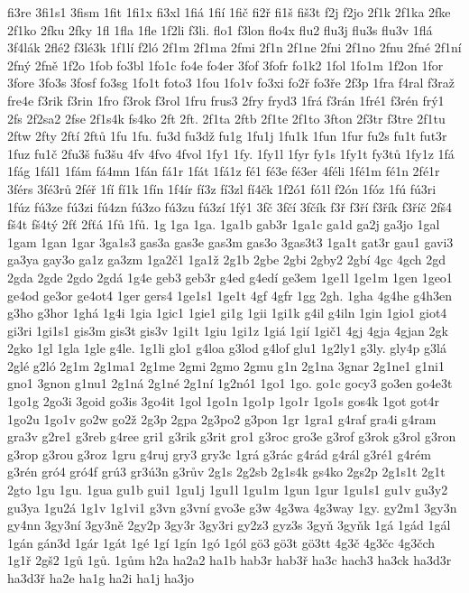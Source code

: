 fi3re
3fi1s1
3fism
1fit
1fi1x
fi3xl
1fiá
1fií
1fič
fi2ř
fi1š
fiš3t
f2j
f2jo
2f1k
2f1ka
2fke
2f1ko
2fku
2fky
1fl
1fla
1fle
1f2li
f3li.
flo1
f3lon
flo4x
flu2
flu3j
flu3s
flu3v
1flá
3f4lák
2flé2
f3lé3k
1f1lí
f2ló
2f1m
2f1ma
2fmi
2f1n
2f1ne
2fni
2f1no
2fnu
2fné
2f1ní
2fný
2fně
1f2o
1fob
fo3bl
1fo1c
fo4e
fo4er
3fof
3fofr
fo1k2
1fol
1fo1m
1f2on
1for
3fore
3fo3s
3fosf
fo3sg
1fo1t
foto3
1fou
1fo1v
fo3xi
fo2ř
fo3ře
2f3p
1fra
f4ral
f3raž
fre4e
f3rik
f3rin
1fro
f3rok
f3rol
1fru
frus3
2fry
fryd3
1frá
f3rán
1fré1
f3rén
frý1
2fs
2f2sa2
2fse
2f1s4k
fs4ko
2ft
2ft.
2f1ta
2ftb
2f1te
2f1to
3fton
2f3tr
f3tre
2f1tu
2ftw
2fty
2ftí
2ftů
1fu
1fu.
fu3d
fu3dž
fu1g
1fu1j
1fu1k
1fun
1fur
fu2s
fu1t
fut3r
1fuz
fu1č
2fu3š
fu3šu
4fv
4fvo
4fvol
1fy1
1fy.
1fy1l
1fyr
fy1s
1fy1t
fy3tů
1fy1z
1fá
1fág
1fál1
1fám
fá4mn
1fán
fá1r
1fát
1fá1z
fé1
fé3e
fé3er
4féli
1fé1m
fé1n
2fé1r
3férs
3fé3rů
2féř
1fí
fí1k
1fín
1f4ír
fí3z
fí3zl
fí4čk
1f2ó1
fó1l
f2ón
1fóz
1fú
fú3ri
1fúz
fú3ze
fú3zi
fú4zn
fú3zo
fú3zu
fú3zí
1fý1
3fč
3fčí
3fčík
f3ř
f3ří
f3řík
f3říč
2fš4
fš4t
fš4tý
2fť
2fťá
1fů
1fů.
1g
1ga
1ga.
1ga1b
gab3r
1ga1c
ga1d
ga2j
ga3jo
1gal
1gam
1gan
1gar
3ga1s3
gas3a
gas3e
gas3m
gas3o
3gas3t3
1ga1t
gat3r
gau1
gavi3
ga3ya
gay3o
ga1z
ga3zm
1ga2č1
1ga1ž
2g1b
2gbe
2gbi
2gby2
2gbí
4gc
4gch
2gd
2gda
2gde
2gdo
2gdá
1g4e
geb3
geb3r
g4ed
g4edí
ge3em
1ge1l
1ge1m
1gen
1geo1
ge4od
ge3or
ge4ot4
1ger
gers4
1ge1s1
1ge1t
4gf
4gfr
1gg
2gh.
1gha
4g4he
g4h3en
g3ho
g3hor
1ghá
1g4i
1gia
1gic1
1gie1
gi1g
1gii
1gi1k
g4il
g4iln
1gin
1gio1
giot4
gi3ri
1gi1s1
gis3m
gis3t
gis3v
1gi1t
1giu
1gi1z
1giá
1gií
1gič1
4gj
4gja
4gjan
2gk
2gko
1gl
1gla
1gle
g4le.
1g1li
glo1
g4loa
g3lod
g4lof
glu1
1g2ly1
g3ly.
gly4p
g3lá
2glé
g2ló
2g1m
2g1ma1
2g1me
2gmi
2gmo
2gmu
g1n
2g1na
3gnar
2g1ne1
g1ni1
gno1
3gnon
g1nu1
2g1ná
2g1né
2g1ní
1g2nó1
1go1
1go.
go1c
gocy3
go3en
go4e3t
1go1g
2go3i
3goid
go3is
3go4it
1gol
1go1n
1go1p
1go1r
1go1s
gos4k
1got
got4r
1go2u
1go1v
go2w
go2ž
2g3p
2gpa
2g3po2
g3pon
1gr
1gra1
g4raf
gra4i
g4ram
gra3v
g2re1
g3reb
g4ree
gri1
g3rik
g3rit
gro1
g3roc
gro3e
g3rof
g3rok
g3rol
g3ron
g3rop
g3rou
g3roz
1gru
g4ruj
gry3
gry3c
1grá
g3rác
g4rád
g4rál
g3ré1
g4rém
g3rén
gró4
gró4f
grú3
gr3ú3n
g3rův
2g1s
2g2sb
2g1s4k
gs4ko
2gs2p
2g1s1t
2g1t
2gto
1gu
1gu.
1gua
gu1b
gui1
1gu1j
1gu1l
1gu1m
1gun
1gur
1gu1s1
gu1v
gu3y2
gu3ya
1gu2á
1g1v
1g1vi1
g3vn
g3vní
gvo3e
g3w
4g3wa
4g3way
1gy.
gy2m1
3gy3n
gy4nn
3gy3ní
3gy3ně
2gy2p
3gy3r
3gy3ri
gy2z3
gyz3s
3gyň
3gyňk
1gá
1gád
1gál
1gán
gán3d
1gár
1gát
1gé
1gí
1gín
1gó
1gól
gö3
gö3t
gö3tt
4g3č
4g3čc
4g3čch
1g1ř
2gš2
1gů
1gů.
1gům
h2a
ha2a2
ha1b
hab3r
hab3ř
ha3c
hach3
ha3ck
ha3d3r
ha3d3ř
ha2e
ha1g
ha2i
ha1j
ha3jo
